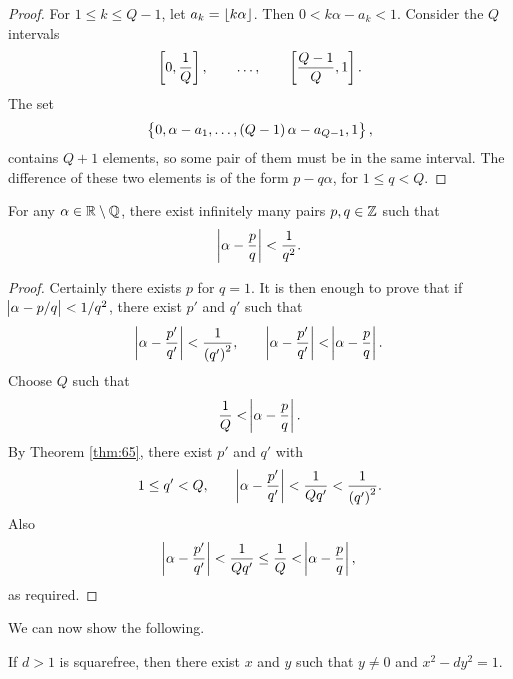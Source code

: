 \begin{proof}
For $ 1 \le k \le Q - 1 $, let $ a_k = \left\lfloor k\alpha \right\rfloor $. Then $ 0 < k\alpha - a_k < 1 $. Consider the $ Q $ intervals
$$ \sbr{0, \dfrac{1}{Q}}, \qquad \dots, \qquad \sbr{\dfrac{Q - 1}{Q}, 1}. $$
The set
$$ \cbr{0, \alpha - a_1, \dots, \br{Q - 1}\alpha - a_{Q - 1}, 1}, $$
contains $ Q + 1 $ elements, so some pair of them must be in the same interval. The difference of these two elements is of the form $ p - q\alpha $, for $ 1 \le q < Q $.
\end{proof}

\begin{corollary}
\label{cor:66}
For any $ \alpha \in \mathbb{R} \setminus \mathbb{Q} $, there exist infinitely many pairs $ p, q \in \mathbb{Z} $ such that
$$ \abs{\alpha - \dfrac{p}{q}} < \dfrac{1}{q^2}. $$
\end{corollary}

\begin{proof}
Certainly there exists $ p $ for $ q = 1 $. It is then enough to prove that if $ \abs{\alpha - p / q} < 1 / q^2 $, there exist $ p' $ and $ q' $ such that
$$ \abs{\alpha - \dfrac{p'}{q'}} < \dfrac{1}{\br{q'}^2}, \qquad \abs{\alpha - \dfrac{p'}{q'}} < \abs{\alpha - \dfrac{p}{q}}. $$
Choose $ Q $ such that
$$ \dfrac{1}{Q} < \abs{\alpha - \dfrac{p}{q}}. $$
By Theorem \ref{thm:65}, there exist $ p' $ and $ q' $ with
$$ 1 \le q' < Q, \qquad \abs{\alpha - \dfrac{p'}{q'}} < \dfrac{1}{Qq'} < \dfrac{1}{\br{q'}^2}. $$
Also
$$ \abs{\alpha - \dfrac{p'}{q'}} < \dfrac{1}{Qq'} \le \dfrac{1}{Q} < \abs{\alpha - \dfrac{p}{q}}, $$
as required.
\end{proof}

\pagebreak

We can now show the following.

\begin{theorem}
If $ d > 1 $ is squarefree, then there exist $ x $ and $ y $ such that $ y \ne 0 $ and $ x^2 - dy^2 = 1 $.
\end{theorem}

